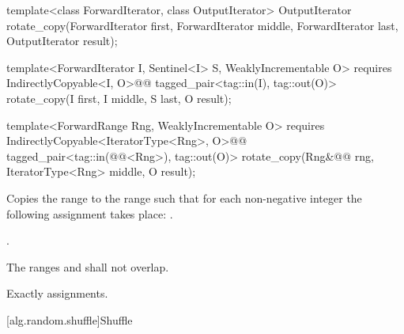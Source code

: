 %
\begin{removedblock}
\begin{itemdecl}
template<class ForwardIterator, class OutputIterator>
  OutputIterator
    rotate_copy(ForwardIterator first, ForwardIterator middle,
                ForwardIterator last, OutputIterator result);
\end{itemdecl}
\end{removedblock}
\begin{addedblock}
\begin{itemdecl}
template<ForwardIterator I, Sentinel<I> S, WeaklyIncrementable O>
  requires IndirectlyCopyable<I, O>@\newtxt{()}@
  tagged_pair<tag::in(I), tag::out(O)>
    rotate_copy(I first, I middle, S last, O result);

template<ForwardRange Rng, WeaklyIncrementable O>
  requires IndirectlyCopyable<IteratorType<Rng>, O>@\newtxt{()}@
  tagged_pair<tag::in(@@<Rng>), tag::out(O)>
    rotate_copy(Rng&@\newtxt{\&}@ rng, IteratorType<Rng> middle, O result);
\end{itemdecl}
\end{addedblock}

\begin{itemdescr}
\pnum
\effects
Copies the range
to the range
such that for each non-negative integer
the following assignment takes place:
.

\pnum
\returns
{}.

\pnum
\requires
The ranges
and
shall not overlap.

\pnum
\complexity
Exactly
assignments.
\end{itemdescr}

[alg.random.shuffle]{Shuffle}

